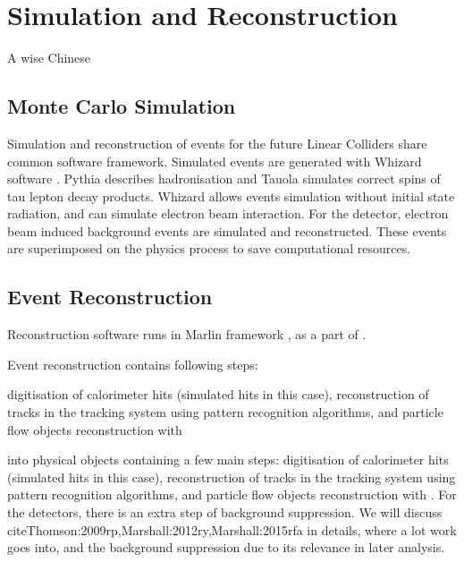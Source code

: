 \chapter{Simulation and Reconstruction}
\label{chap:Reconstruction}

%
{A wise Chinese}%


\section{Monte Carlo Simulation}

Simulation and reconstruction of events for the future Linear Colliders share common software framework. Simulated events are generated with Whizard software \cite{}. Pythia describes hadronisation and Tauola simulates correct spins of tau lepton decay products.  Whizard allows events simulation without initial state radiation, and can simulate electron beam interaction. For the \CLIC detector, electron beam induced background events are simulated and reconstructed. These events are superimposed on the physics process to save computational resources.


\section{Event Reconstruction}

Reconstruction software runs in Marlin framework \cite{Gaede:2006pj}, as a part of \ilcsoft.

Event reconstruction contains following steps: 

digitisation of calorimeter hits (simulated hits in this case), reconstruction of tracks in the tracking system using pattern recognition algorithms, and particle flow objects reconstruction with \pandora
  
into physical objects containing a few main steps: digitisation of calorimeter hits (simulated hits in this case), reconstruction of tracks in the tracking system using pattern recognition algorithms, and particle flow objects reconstruction with \pandora. For the \CLIC detectors, there is an extra step of \ggHad background suppression. We will discuss \pandora cite{Thomson:2009rp,Marshall:2012ry,Marshall:2015rfa} in details, where a lot work goes into, and the background suppression due to its relevance in later analysis.

